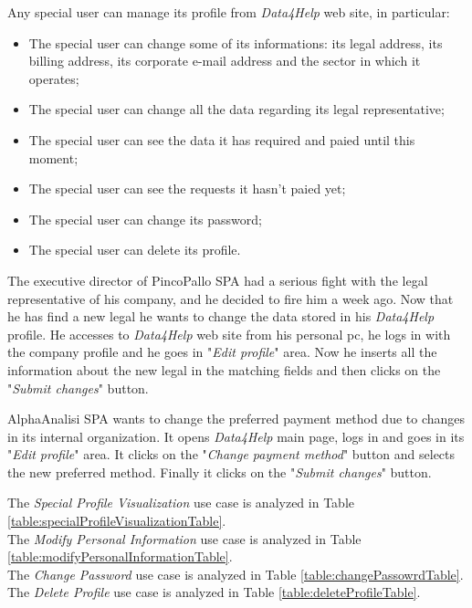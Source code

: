 Any special user can manage its profile from \textit{Data4Help} web site, in particular:
\begin{itemize}
  \item The special user can change some of its informations: its legal address, its billing address, its corporate e-mail address and the sector in which it operates;
  \item The special user can change all the data regarding its legal representative;
  \item The special user can see the data it has required and paied until this moment;
  \item The special user can see the requests it hasn't paied yet;
  \item The special user can change its password;
  \item The special user can delete its profile.
\end{itemize}

The executive director of PincoPallo SPA had a serious fight with the legal representative of his company, and he decided to fire him a week ago. Now that he has find a new legal he wants to change the data stored in his \textit{Data4Help} profile. He accesses to \textit{Data4Help} web site from his personal pc, he logs in with the company profile and he goes in "\textit{Edit profile}" area. Now he inserts all the information about the new legal in the matching fields and then clicks on the "\textit{Submit changes}" button.

AlphaAnalisi SPA wants to change the preferred payment method due to changes in its internal organization. It opens \textit{Data4Help} main page, logs in and goes in its "\textit{Edit profile}" area. It clicks on the "\textit{Change payment method}" button and selects the new preferred method. Finally it clicks on the "\textit{Submit changes}" button.

The \textit{Special Profile Visualization} use case is analyzed in Table \ref{table:specialProfileVisualizationTable}. \\
The \textit{Modify Personal Information} use case is analyzed in Table \ref{table:modifyPersonalInformationTable}. \\
The \textit{Change Password} use case is analyzed in Table \ref{table:changePassowrdTable}. \\
The \textit{Delete Profile} use case is analyzed in Table \ref{table:deleteProfileTable}. \\

